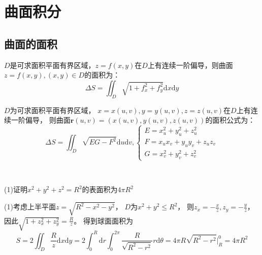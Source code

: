 \newpage

\chapter{曲面积分}

\section{曲面的面积}

\begin{theorem}[曲面面积公式]
  $D$是可求面积平面有界区域，$z = f(x,y)$在$D$上有连续一阶偏导，则曲面$z = f(x,y), (x,y) \in D$的面积为：
  \begin{equation*}
    \Delta S = \iint_D \sqrt{1 + f_x^2 + f_y^2}\mathrm{d} x\mathrm{d} y
  \end{equation*}
\end{theorem}

\begin{theorem}[参数方程曲面面积]
  $D$为可求面积平面有界区域，
  $x = x(u,v), y = y(u,v), z = z(u,v)$在$D$上有连续一阶偏导，
  则曲面$\mathbf{r}(u,v) = (x(u,v),y(u,v),z(u,v))$的面积公式为：
  \begin{equation*}
    \Delta S = \iint_D \sqrt{EG - F^2}\mathrm{d} u \mathrm{d} v,
    \begin{cases}
      E = x_u^2 + y_u^2 + z_u^2\\
      F = x_ux_v + y_uy_v + z_uz_v\\
      G = x_v^2 + y_v^2 + z_v^2
    \end{cases}
  \end{equation*}
\end{theorem}

~

\begin{exercise}[曲面面积计算]
  (1)证明$x^2 + y^2 + z^2 = R^2$的表面积为$4 \pi R^2$
\end{exercise}

\begin{solution}
  (1)考虑上半平面$z = \sqrt{R^2 - x^2 - y^2}$，
  $D$为$x^2 + y^2 \leq R^2$，
  则$z_x = - \frac{x}{z}, z_y = - \frac{y}{z}$，
  因此$\sqrt{1 + z_x^2 + z_y^2} = \frac{R}{z}$。
  得到球面面积为
  \begin{equation*}
   S =  
   2 \iint_D \frac{R}{z} \mathrm{d} x \mathrm{d} y = 2 \int_0^R \mathrm{d} r \int_0^{2\pi} \frac{R}{\sqrt{R^2 - r^2}} r \mathrm{d} \theta = 4\pi R \sqrt{R^2 - r^2} \bigg|_R^0 = 4\pi R^2
  \end{equation*}
\end{solution}

